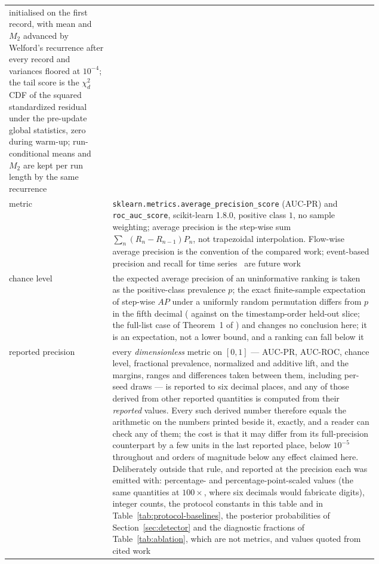 \documentclass[manuscript,anonymous,review]{acmart}
\begin{document}
\begin{table}
\begin{tabular}{@{}lp{0.72\linewidth}@{}}
initialised on the first record, with mean and $M_2$ advanced by Welford's
recurrence after every record and variances floored at $10^{-4}$; the tail
score is the $\chi^2_d$ CDF of the squared standardized residual under the
pre-update global statistics, zero during warm-up; run-conditional means and
$M_2$ are kept per run length by the same recurrence \\
metric & \texttt{sklearn.metrics.average\_precision\_score} (AUC-PR) and
\texttt{roc\_auc\_score}, scikit-learn 1.8.0, positive class $1$, no sample
weighting; average precision is the step-wise sum
$\sum_n (R_n-R_{n-1})P_n$, not trapezoidal interpolation. Flow-wise average
precision is the convention of the compared work; event-based precision and
recall for time series~\citep{tatbul2018precision} are future work \\
chance level & the expected average precision of an uninformative ranking is
taken as the positive-class prevalence $p$; the exact finite-sample expectation
of step-wise $AP$ under a uniformly random permutation differs from $p$ in the
fifth decimal (\ChanceExactNaturalSliceAucpr{} against
\SFourCicidsNaturalChanceFloor{} on the timestamp-order held-out slice; the
full-list case of Theorem~1 of \citet{manzhos2026ap}) and
changes no conclusion here; it is an expectation, not a lower bound, and a
ranking can fall below it \\
reported precision & every \emph{dimensionless} metric on $[0,1]$ ---
AUC-PR, AUC-ROC, chance level, fractional prevalence, normalized and additive
lift, and the margins, ranges and differences taken between them, including
per-seed draws --- is reported to six decimal places, and any of those derived
from other reported quantities is computed from their \emph{reported} values.
Every such derived number therefore equals the arithmetic on the numbers
printed beside it, exactly, and a reader can check any of them; the cost is
that it may differ from its full-precision counterpart by a few units in the
last reported place, below $10^{-5}$ throughout and orders of magnitude below
any effect claimed here. Deliberately outside that rule, and reported at the
precision each was emitted with: percentage- and percentage-point-scaled
values (the same quantities at $100\times$, where six decimals would fabricate
digits), integer counts, the protocol constants in this table and in
Table~\ref{tab:protocol-baselines}, the posterior
probabilities of Section~\ref{sec:detector} and the diagnostic fractions of
Table~\ref{tab:ablation}, which are not metrics, and values quoted from cited
work \\
\bottomrule
\end{tabular}
\end{table}
\end{document}
